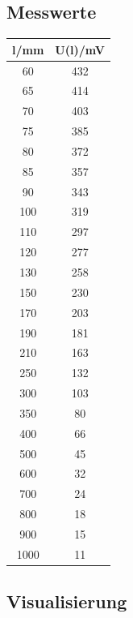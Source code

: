 \documentclass[12pt, a4paper]{article}
\begin{document}
\subsection{Messwerte}
\begin{tabular}{ |c|c| }
    \hline
    l/mm & U(l)/mV \\
    \hline
    \hline
    60 & 432 \\
    \hline
    65 & 414 \\
    \hline
    70 & 403 \\
    \hline
    75 & 385 \\
    \hline
    80 & 372 \\
    \hline
    85 & 357 \\
    \hline
    90 & 343 \\
    \hline
    100 & 319 \\
    \hline
    110 & 297 \\
    \hline
    120 & 277 \\
    \hline
    130 & 258 \\
    \hline
    150 & 230 \\
    \hline
    170 & 203 \\
    \hline
    190 & 181 \\
    \hline
    210 & 163 \\
    \hline
    250 & 132 \\
    \hline
    300 & 103 \\
    \hline
    350 & 80 \\
    \hline
    400 & 66 \\
    \hline
    500 & 45 \\
    \hline
    600 & 32 \\
    \hline
    700 & 24 \\
    \hline
    800 & 18 \\
    \hline
    900 & 15 \\
    \hline
    1000 & 11 \\
    \hline
\end{tabular}

\subsection{Visualisierung}
\end{document}
